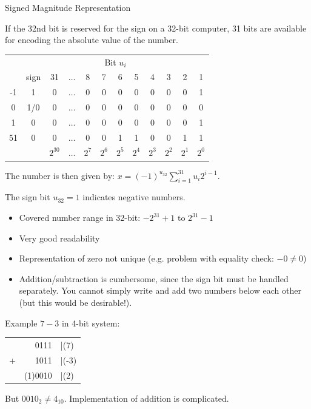 \documentclass[11pt,compress,t,notes=noshow, xcolor=table]{beamer}
\begin{document}
\begin{vbframe}{Signed Magnitude Representation}



If the 32nd bit is reserved for the sign on a 32-bit computer, 31 bits are available for encoding the absolute value of the number.

\begin{footnotesize}
\begin{center}
  \begin{tabular}{ c | ccccccccccc}
    & \multicolumn{11}{c}{Bit $u_i$} \\
    & sign & 31  & $\hdots$ & 8 & 7 & 6 & 5 & 4 & 3 & 2 & 1 \\
    \hline
    -1 & 1 & 0 & $\hdots$ & 0 & 0 & 0 & 0 & 0 & 0 & 0 & 1 \\
     0 & 1/0 & 0 & $\hdots$ & 0 & 0 & 0 & 0 & 0 & 0 & 0 & 0 \\
     1 & 0 & 0 & $\hdots$ & 0 & 0 & 0 & 0 & 0 & 0 & 0 & 1 \\
    51 & 0 & 0 & $\hdots$ & 0 & 0 & 1 & 1 & 0 & 0 & 1 & 1 \\
    \hline
      &  & $2^{30}$ & $\hdots$ & $2^7$ & $2^6$ & $2^5$ & $2^4$ & $2^3$ & $2^2$ & $2^1$ & $2^0$
  \end{tabular}
\end{center}
\end{footnotesize}

The number is then given by: $x = (-1)^{u_{32}}\sum_{i=1}^{31} u_i 2^{i-1}$.

The sign bit $u_{32} = 1$ indicates negative numbers.



\framebreak
\begin{itemize}
  \item Covered number range in 32-bit: $-2^{31}+1$ to $2^{31}-1$
  \item Very good readability
  \item Representation of zero not unique (e.g. problem with equality check: $-0 \neq 0$)
  \item Addition/subtraction is cumbersome, since the sign bit must be handled separately. You cannot simply write and add two numbers below each other (but this would be desirable!).
\end{itemize}
Example $7 - 3$ in 4-bit system:

\begin{center}
  \begin{tabular}{crl}
    &0111 &|(7)\\
    +&1011 &|(-3)\\\hline
    &(1)0010 &|(2)
  \end{tabular}
\end{center}

But $0010_2 \neq 4_{10}$. Implementation of addition is complicated.
\end{vbframe}
\end{document}

